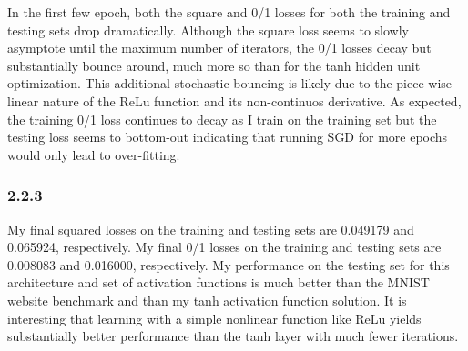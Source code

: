 \documentclass[12pt]{amsart}
\begin{document}
In the first few epoch, both the square and 0/1 losses for both the training and testing sets drop dramatically.  Although the square loss seems to slowly asymptote until the maximum number of iterators, the 0/1 losses decay but substantially bounce around, much more so than for the tanh hidden unit optimization.  This additional stochastic bouncing is likely due to the piece-wise linear nature of the ReLu function and its non-continuos derivative.  As expected, the training 0/1 loss continues to decay as I train on the training set but the testing loss seems to bottom-out indicating that running SGD for more epochs would only lead to over-fitting.

\subsubsection*{2.2.3}
My final squared losses on the training and testing sets are 0.049179 and 0.065924, respectively.  My final 0/1 losses on the training and testing sets are 0.008083 and 0.016000, respectively.  My performance on the testing set for this architecture and set of activation functions is much better than the MNIST website benchmark and than my tanh activation function solution.  It is interesting that learning with a simple nonlinear function like ReLu yields substantially better performance than the tanh layer with much fewer iterations.
\end{document}
